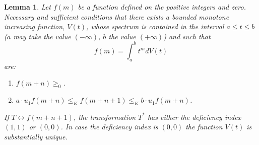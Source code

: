 \documentclass{article}
\newtheorem{lemma}{Lemma}
\begin{document}
\begin{lemma}
\label{lem:one-dimensional}
Let $f(m)$ be a function defined on the positive integers and zero. Necessary and sufficient conditions that there exists a bounded monotone increasing function, $V(t)$, whose spectrum is contained in the interval $a \leq t \leq b$ ($a$ may take the value $(-\infty)$, $b$ the value $(+\infty)$) and such that
\begin{equation}
f(m) = \int_a^b t^m dV(t)
\label{eq:moment-representation}
\end{equation}
are:
\begin{enumerate}
\item $f(m+n) \geq_0$.
\item $a \cdot u_1 f(m+n) \leq_K f(m+n+1) \leq_K b \cdot u_1 f(m+n)$.
\end{enumerate}

If $T \leftrightarrow f(m+n+1)$, the transformation $T^*$ has either the deficiency index $(1, 1)$ or $(0, 0)$. In case the deficiency index is $(0, 0)$ the function $V(t)$ is substantially unique.
\end{lemma}
\end{document}
